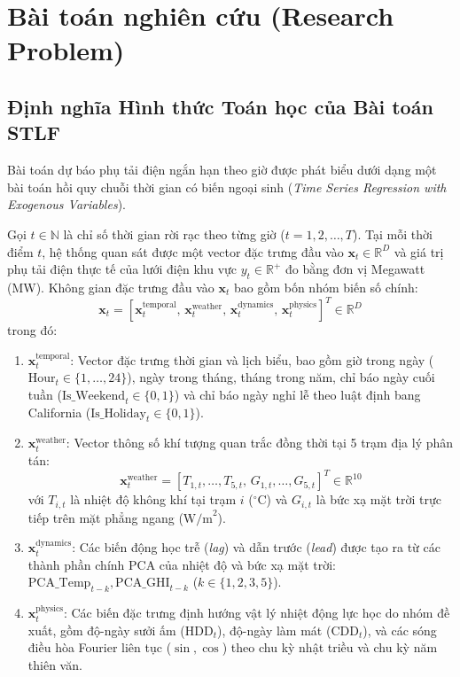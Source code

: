 \section{Bài toán nghiên cứu (Research Problem)}
\label{sec:research_problem}

\subsection{Định nghĩa Hình thức Toán học của Bài toán STLF}
Bài toán dự báo phụ tải điện ngắn hạn theo giờ được phát biểu dưới dạng một bài toán hồi quy chuỗi thời gian có biến ngoại sinh (\textit{Time Series Regression with Exogenous Variables}). 

Gọi $t \in \mathbb{N}$ là chỉ số thời gian rời rạc theo từng giờ ($t = 1, 2, \dots, T$). Tại mỗi thời điểm $t$, hệ thống quan sát được một vector đặc trưng đầu vào $\mathbf{x}_t \in \mathbb{R}^D$ và giá trị phụ tải điện thực tế của lưới điện khu vực $y_t \in \mathbb{R}^+$ đo bằng đơn vị Megawatt (MW). Không gian đặc trưng đầu vào $\mathbf{x}_t$ bao gồm bốn nhóm biến số chính:
\begin{equation}
    \mathbf{x}_t = \left[ \mathbf{x}_t^{\text{temporal}}, \, \mathbf{x}_t^{\text{weather}}, \, \mathbf{x}_t^{\text{dynamics}}, \, \mathbf{x}_t^{\text{physics}} \right]^T \in \mathbb{R}^D
\end{equation}
trong đó:
\begin{enumerate}
    \item $\mathbf{x}_t^{\text{temporal}}$: Vector đặc trưng thời gian và lịch biểu, bao gồm giờ trong ngày ($\text{Hour}_t \in \{1, \dots, 24\}$), ngày trong tháng, tháng trong năm, chỉ báo ngày cuối tuần ($\text{Is\_Weekend}_t \in \{0, 1\}$) và chỉ báo ngày nghỉ lễ theo luật định bang California ($\text{Is\_Holiday}_t \in \{0, 1\}$).
    \item $\mathbf{x}_t^{\text{weather}}$: Vector thông số khí tượng quan trắc đồng thời tại 5 trạm địa lý phân tán:
    \begin{equation}
        \mathbf{x}_t^{\text{weather}} = \left[ T_{1, t}, \dots, T_{5, t}, \, G_{1, t}, \dots, G_{5, t} \right]^T \in \mathbb{R}^{10}
    \end{equation}
    với $T_{i, t}$ là nhiệt độ không khí tại trạm $i$ ($^\circ\text{C}$) và $G_{i, t}$ là bức xạ mặt trời trực tiếp trên mặt phẳng ngang ($\text{W/m}^2$).
    \item $\mathbf{x}_t^{\text{dynamics}}$: Các biến động học trễ (\textit{lag}) và dẫn trước (\textit{lead}) được tạo ra từ các thành phần chính PCA của nhiệt độ và bức xạ mặt trời: $\text{PCA\_Temp}_{t-k}, \text{PCA\_GHI}_{t-k}$ ($k \in \{1, 2, 3, 5\}$).
    \item $\mathbf{x}_t^{\text{physics}}$: Các biến đặc trưng định hướng vật lý nhiệt động lực học do nhóm đề xuất, gồm độ-ngày sưởi ấm ($\text{HDD}_t$), độ-ngày làm mát ($\text{CDD}_t$), và các sóng điều hòa Fourier liên tục ($\sin, \cos$) theo chu kỳ nhật triều và chu kỳ năm thiên văn.
\end{enumerate}

